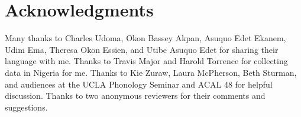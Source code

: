 \documentclass[output=paper]{langscibook}
\begin{document}
\section*{Acknowledgments}

Many thanks to Charles Udoma, Okon Bassey Akpan, Asuquo Edet Ekanem, Udim Ema, Theresa Okon Essien, and Utibe Asuquo Edet for sharing their language with me. Thanks to Travis Major and Harold Torrence for collecting data in Nigeria for me. Thanks to Kie Zuraw, Laura McPherson, Beth Sturman, and audiences at the UCLA Phonology Seminar and ACAL 48 for helpful discussion. Thanks to two anonymous reviewers for their comments and suggestions. 

\end{document}
